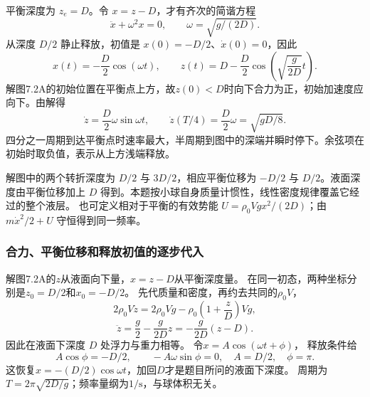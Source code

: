 \documentclass[UTF8,fontset=fandol,a4paper,11pt]{ctexart}
\begin{document}
平衡深度为 $z_e=D$。令 $x=z-D$，才有齐次的简谐方程
\[\ddot x+\omega^2x=0,\qquad\omega=\sqrt{g/(2D)}.\]
从深度 $D/2$ 静止释放，初值是 $x(0)=-D/2$、$\dot x(0)=0$，因此
\[x(t)=-\frac D2\cos(\omega t),\qquad
\boxed{z(t)=D-\frac D2\cos\left(\sqrt{\frac g{2D}}t\right).}\]
解图7.2A的初始位置在平衡点上方，故$z(0)<D$时向下合力为正，初始加速度应向下。由解得
\[\dot z=\frac D2\omega\sin\omega t,
\qquad \dot z(T/4)=\frac D2\omega=\sqrt{gD/8}.\]
四分之一周期到达平衡点时速率最大，半周期到图中的深端并瞬时停下。余弦项在初始时取负值，表示从上方浅端释放。

解图中的两个转折深度为 $D/2$ 与 $3D/2$，相应平衡位移为 $-D/2$ 与 $D/2$。液面深度由平衡位移加上 $D$ 得到。本题按小球自身质量计惯性，线性密度规律覆盖它经过的整个液层。
也可定义相对于平衡的有效势能 $U=\rho_0Vg x^2/(2D)$；由 $m\dot x^2/2+U$ 守恒得到同一频率。
\subsubsection*{合力、平衡位移和释放初值的逐步代入}
解图7.2A的$z$从液面向下量，$x=z-D$从平衡深度量。
在同一初态，两种坐标分别是$z_0=D/2$和$x_0=-D/2$。
先代质量和密度，再约去共同的$\rho_0V$，
\[
2\rho_0V\ddot z=2\rho_0Vg-
\rho_0\left(1+\frac zD\right)Vg,
\]
\[
\ddot z=\frac g2-\frac g{2D}z
=-\frac g{2D}(z-D).
\]
因此在液面下深度 $D$ 处浮力与重力相等。
令$x=A\cos(\omega t+\phi)$，
释放条件给
\[
A\cos\phi=-D/2,\qquad -A\omega\sin\phi=0,
\quad A=D/2,\quad\phi=\pi.
\]
这恢复$x=-(D/2)\cos\omega t$，加回$D$才是题目所问的液面下深度。
周期为$T=2\pi\sqrt{2D/g}$；频率量纲为$1/\mathrm s$，与球体积无关。
\end{document}
